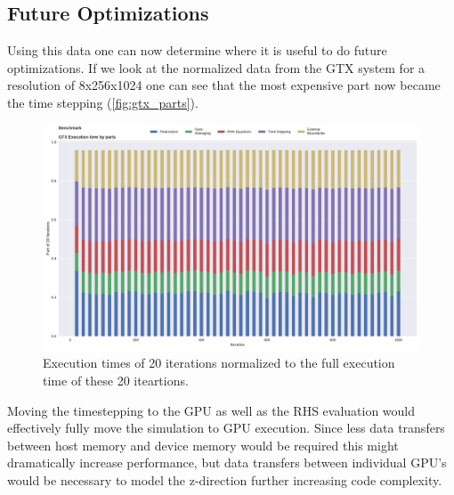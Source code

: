 \documentclass[master.tex]{subfiles}
\begin{document}
\subsection{Future Optimizations}
Using this data one can now determine where it is useful to do future optimizations. If we look at the normalized data from the \ac{GTX} system for a resolution of 8x256x1024 one can see that the most expensive part now became the time stepping (\autoref{fig:gtx_parts}).
\begin{figure}[!hbtp]
    \centering
    \includegraphics[width=\linewidth]{pdfs/gtx_parts.pdf}
    \caption{\small Execution times of 20 iterations normalized to the full execution time of these 20 iteartions.}
    \label{fig:gtx_parts}
\end{figure}
Moving the timestepping to the GPU as well as the \ac{RHS} evaluation would effectively fully move the simulation to GPU execution. Since less data transfers between host memory and device memory would be required this might dramatically increase performance, but data transfers between individual GPU's would be necessary to model the z-direction further increasing code complexity.
\end{document}

